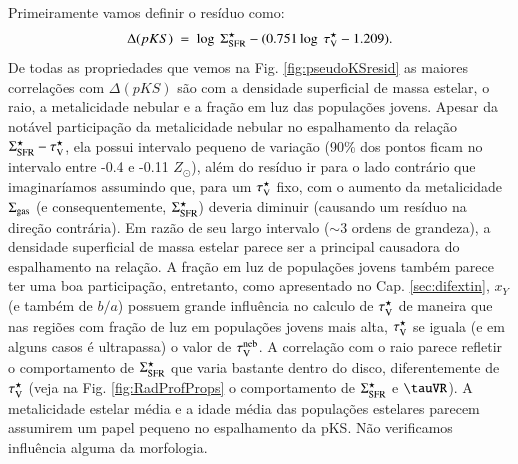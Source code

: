 Primeiramente vamos definir o resíduo como:
\begin{equation}
	\Delta(pKS)\ =\ \log\ \SigmaSFR - (0.751 \log\ \tauVS - 1.209).
	\label{eq:DeltapKS}
\end{equation}
\noindent De todas as propriedades que vemos na Fig. \ref{fig:pseudoKSresid} as maiores correlações
com $\Delta(pKS)$ são com a densidade superficial de massa estelar, o raio, a metalicidade nebular e
a fração em luz das populações jovens. Apesar da notável participação da metalicidade nebular no
espalhamento da relação $\Sigma_{\mathrm{SFR}}^\star - \tau_{\mathrm{V}}^\star$, ela possui intervalo pequeno de variação (90\% dos
pontos ficam no intervalo entre -0.4 e -0.11 $Z_\odot$), além do resíduo ir para o lado contrário
que imaginaríamos assumindo que, para um $\tau_{\mathrm{V}}^\star$ fixo, com o aumento da metalicidade $\Sigma_{\mathrm{gas}}$
(e consequentemente, $\Sigma_{\mathrm{SFR}}^\star$) deveria diminuir (causando um resíduo na direção contrária). Em
razão de seu largo intervalo ($\sim 3$ ordens de grandeza), a densidade superficial de massa
estelar parece ser a principal causadora do espalhamento na relação. A fração em luz de populações
jovens também parece ter uma boa participação, entretanto, como apresentado no Cap.
\ref{sec:difextin}, $x_Y$ (e também de $b/a$) possuem grande influência no calculo de $\tau_{\mathrm{V}}^\star$ de
maneira que nas regiões com fração de luz em populações jovens mais alta, $\tau_{\mathrm{V}}^\star$ se iguala (e em
alguns casos é ultrapassa) o valor de $\tau_{\mathrm{V}}^{\mathrm{neb}}$. A correlação com o raio parece refletir o
comportamento de $\Sigma_{\mathrm{SFR}}^\star$ que varia bastante dentro do disco, diferentemente de $\tau_{\mathrm{V}}^\star$ (veja
na Fig. \ref{fig:RadProfProps} o comportamento de $\Sigma_{\mathrm{SFR}}^\star$ e $\tauVR$). A metalicidade estelar
média e a idade média das populações estelares parecem assumirem um papel pequeno no espalhamento
da pKS. Não verificamos influência alguma da morfologia.

